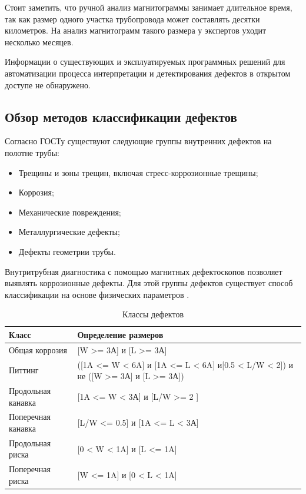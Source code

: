\documentclass[a4paper,article,14pt]{extarticle}
\begin{document}
Стоит заметить, что ручной анализ магнитограммы занимает длительное время, так как размер одного участка трубопровода 
может составлять десятки километров. На анализ магнитограмм такого размера у экспертов уходит несколько месяцев.

Информации о существующих и эксплуатируемых программных решений для автоматизации процесса интерпретации и детектирования дефектов в открытом доступе не обнаружено.


\subsection{Обзор методов классификации дефектов}

Согласно ГОСТу \cite{g1} существуют следующие группы  внутренних дефектов на полотне трубы:

\begin{itemize}
    \item Трещины и зоны трещин, включая стресс-коррозионные трещины;
    \item Коррозия;
    \item Механические повреждения;
    \item Металлургические дефекты;
    \item Дефекты геометрии трубы.
\end{itemize}

Внутритрубная диагностика с помощью магнитных дефектоскопов позволяет выявлять коррозионные дефекты.
Для этой группы дефектов существует способ классификации на основе физических 
параметров \cite{g2}.

\begin{center}
    \begin{longtable}{|p{5cm}|p{7cm}|}
        \caption{Классы дефектов}\\\hline
        Класс & Определение размеров \\ \hline
        Общая коррозия & [W >= 3А] и [L >= 3А] \\ \hline
        Питтинг & ([1A <= W < 6A] и [1A <= L < 6A] и[0.5 < L/W < 2]) и не ([W >= 3А] и [L >= 3А]) \\ \hline
        Продольная канавка & [1A <= W < 3А] и [L/W >= 2 ] \\ \hline
        Поперечная канавка & [L/W <= 0.5] и [1A <= L < 3А] \\ \hline
        Продольная риска & [0 < W < 1A] и [L <= 1A] \\ \hline
        Поперечная риска & [W <= 1A] и [0 < L < 1A] \\ \hline
    \end{longtable}
\end{center}
\end{document}
